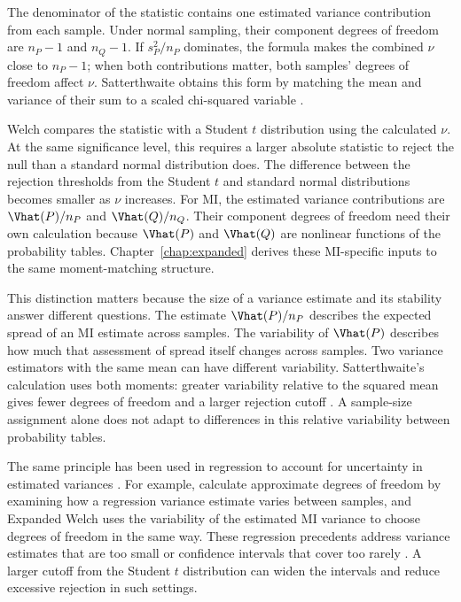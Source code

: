 The denominator of the statistic contains one estimated variance contribution
from each sample. Under normal sampling, their component degrees of freedom
are \(n_P-1\) and \(n_Q-1\). If \(s_P^2/n_P\) dominates, the formula makes the
combined \(\nu\) close to \(n_P-1\); when both contributions matter, both
samples' degrees of freedom affect \(\nu\). Satterthwaite obtains this form
by matching the mean and variance of their sum to a scaled chi-squared variable
\citep{satterthwaite1946}.

Welch compares the statistic with a Student \(t\) distribution using the calculated
\(\nu\). At the same significance level, this requires a larger absolute
statistic to reject the null than a standard normal distribution does.
The difference between the rejection thresholds from the Student \(t\)
and standard normal distributions becomes
smaller as \(\nu\) increases.
For MI, the estimated variance contributions are \(\Vhat(P)/n_P\) and
\(\Vhat(Q)/n_Q\). Their component degrees of freedom need their own
calculation because \(\Vhat(P)\) and \(\Vhat(Q)\) are nonlinear functions of
the probability tables. Chapter~\ref{chap:expanded} derives these
MI-specific inputs to the same moment-matching structure.

This distinction matters because the size of a variance estimate and its
stability answer different questions. The estimate \(\Vhat(P)/n_P\)
describes the expected spread of an MI estimate across samples. The
variability of \(\Vhat(P)\) describes how much that assessment of spread
itself changes across samples. Two variance estimators with the same mean
can have different variability. Satterthwaite's calculation uses both
moments: greater variability relative to the squared mean gives fewer
degrees of freedom and a larger rejection cutoff
\citep{satterthwaite1946}. A sample-size assignment alone does not adapt
to differences in this relative variability between probability tables.

The same principle has been used in regression to account for
uncertainty in estimated variances
\citep{panwall2002,bell2002,kauermann2001,fay2001,imbens2016}.
For example, \citet{panwall2002} calculate approximate degrees of freedom
by examining how a regression variance estimate varies between samples,
and Expanded Welch uses the variability of the estimated MI variance to choose
degrees of freedom in the same way.
These regression precedents address variance estimates that are too small
or confidence intervals that cover too rarely
\citep{bell2002,kauermann2001}. A larger cutoff from the Student \(t\)
distribution can widen the intervals and reduce excessive rejection in such
settings.

